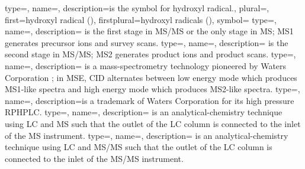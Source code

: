 
 {
	type=\chemtype,
	name={}, 
	description={is the symbol for hydroxyl radical.},
	plural={},
	first={hydroxyl radical ({})},
	firstplural={hydroxyl radicals ({})},
	symbol={}
}
 {
	type=\chemtype, 
	name={}, 
	description={
		is the first  stage in \gls{MS/MS} or the only stage in \gls{MS}; 
			\gls{MS1} generates precursor ions and survey  scans.}
}
 {
	type=\chemtype,
	name={}, 
	description={
		is the second stage in \gls{MS/MS}; 
			\gls{MS2} generates product   ions and product scans.}
}
 {
	type=\chemtype, 
	name={}, 
	description={
		is a mass-spectrometry technology pioneered by Waters Corporation \cite{plumb2006uplc};
		in \gls{MSE}, \gls{CID} alternates between
		low energy mode which produces \gls{MS1}-like spectra and high energy mode which produces \gls{MS2}-like spectra.}
}
 {
	type=\chemtype,
	name=, 
	description={is a trademark of Waters Corporation for its high pressure \gls{RPHPLC}.}
}
 {	
	type=\chemtype,
	name={}, 
	description={
		is an analytical-chemistry technique using \gls{LC} and \gls{MS} 
			such that the outlet of the \gls{LC} column is connected to the inlet of the \gls{MS} instrument.}
}
 {	
	type=\chemtype,
	name={}, 
	description={
		is  an analytical-chemistry technique using \gls{LC} and \gls{MS/MS} 
			such that the outlet of the \gls{LC} column is connected to the inlet of the \gls{MS/MS} instrument.
	}
}

